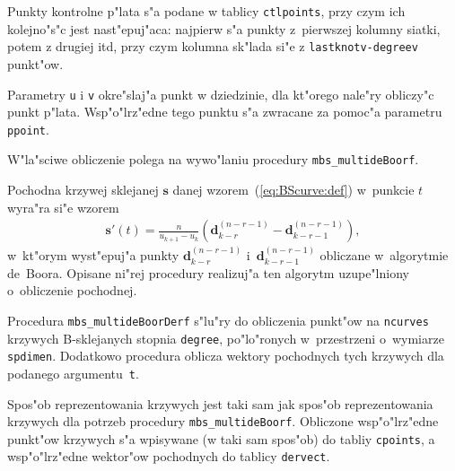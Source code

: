 Punkty kontrolne p"lata s"a podane w tablicy \texttt{ctlpoints}, przy czym
ich kolejno"s"c jest nast"epuj"aca: najpierw s"a punkty z~pierwszej kolumny
siatki, potem z drugiej itd, przy czym kolumna sk"lada si"e z
\texttt{lastknotv-degreev} punkt"ow.

Parametry \texttt{u} i \texttt{v} okre"slaj"a punkt w dziedzinie, dla
kt"orego nale"ry obliczy"c punkt p"lata. Wsp"o"lrz"edne tego punktu s"a
zwracane za pomoc"a parametru \texttt{ppoint}.

W"la"sciwe obliczenie polega na wywo"laniu procedury
\texttt{mbs\_multideBoorf}.


\vspace{\bigskipamount}
Pochodna krzywej sklejanej $\bm{s}$ danej wzorem~(\ref{eq:BScurve:def})
w~punkcie $t$ wyra"ra si"e wzorem
\begin{align}
  \bm{s}'(t) = \frac{n}{u_{k+1}-u_k}(\bm{d}^{(n-r-1)}_{k-r} -
  \bm{d}^{(n-r-1)}_{k-r-1}),
\end{align}
w~kt"orym wyst"epuj"a punkty $\bm{d}^{(n-r-1)}_{k-r}$
i~$\bm{d}^{(n-r-1)}_{k-r-1}$ obliczane w~algorytmie de~Boora. Opisane ni"rej
procedury realizuj"a ten algorytm uzupe"lniony o~obliczenie pochodnej.

\vspace{\bigskipamount}
\begin{sloppypar}
Procedura \texttt{mbs\_multideBoorDerf} s"lu"ry do obliczenia punkt"ow na
\texttt{ncurves} krzywych B-sklejanych stopnia \texttt{degree}, po"lo"ronych
w~przestrzeni o~wymiarze \texttt{spdimen}. Dodatkowo procedura oblicza wektory
pochodnych tych krzywych dla podanego argumentu~\texttt{t}.
\end{sloppypar}

Spos"ob reprezentowania krzywych jest taki sam jak spos"ob reprezentowania
krzywych dla potrzeb procedury \texttt{mbs\_multideBoorf}. Obliczone
wsp"o"lrz"edne punkt"ow krzywych s"a wpisywane (w taki sam spos"ob) do
tabliy \texttt{cpoints}, a wsp"o"lrz"edne wektor"ow pochodnych do tablicy
\texttt{dervect}.

